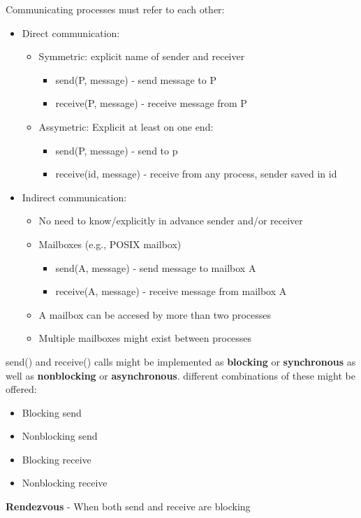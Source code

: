 \documentclass{article}
\begin{document}
{    Communicating processes must refer to each other:
    \begin{itemize}
        \item Direct communication:
            \begin{itemize}
                \item Symmetric: explicit name of sender and receiver
                    \begin{itemize}
                        \item send(P, message) - send message to P
                        \item receive(P, message) - receive message from P
                    \end{itemize}
                \item Assymetric: Explicit at least on one end:
                    \begin{itemize}
                        \item send(P, message) - send to p 
                        \item receive(id, message) - receive from any process, sender saved in id
                    \end{itemize}
            \end{itemize}
        \item Indirect communication:
            \begin{itemize}
                \item No need to know/explicitly in advance sender and/or receiver 
                \item Mailboxes (e.g., POSIX mailbox)
                    \begin{itemize}
                        \item send(A, message) - send message to mailbox A
                        \item receive(A, message) - receive message from mailbox A 
                    \end{itemize}
                \item A mailbox can be accesed by more than two processes
                \item Multiple mailboxes might exist between processes 
            \end{itemize}
    \end{itemize}

        send() and receive() calls might be implemented as \textbf{blocking} or \textbf{synchronous} as well as \textbf{nonblocking} or \textbf{asynchronous}.
    different combinations of these might be offered:
    \begin{itemize}
        \item Blocking send 
        \item Nonblocking send 
        \item Blocking receive 
        \item Nonblocking receive
    \end{itemize}

    \textbf{Rendezvous} - When both send and receive are blocking
    }
\end{document}
